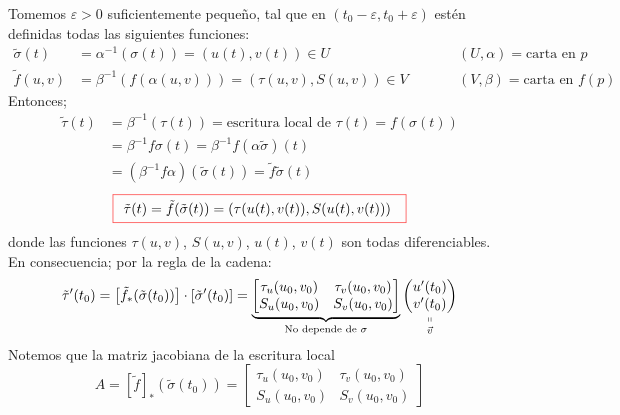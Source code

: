 
   Tomemos $\varepsilon > 0$ suficientemente pequeño, tal que en $(t_0 - \varepsilon, t_0 + \varepsilon)$ estén definidas todas las siguientes funciones:
   \begin{align*}
   \tilde{\sigma}(t) &= \alpha^{-1}(\sigma(t)) = (u(t), v(t)) \in U \quad \quad &&(U, \alpha) = \text{carta en } p \\
   \tilde{f}(u,v) &= \beta^{-1}(f(\alpha(u,v))) = (\tau(u,v), S(u,v)) \in V \quad \quad &&(V, \beta) = \text{carta en } f(p)
   \end{align*}
   Entonces;
   \begin{align*}
      \tilde{\tau}(t) &= \beta^{-1}(\tau(t)) = \text{escritura local de } \tau(t) = f(\sigma(t))\\
                                        &= \beta^{-1} f \sigma(t) = \beta^{-1} f (\alpha \tilde{\sigma})(t) \\
                                        &= (\beta^{-1} f \alpha)(\tilde{\sigma}(t)) = \tilde{f} \tilde{\sigma}(t)
   \end{align*}
   \vspace{-0.5cm}
   \begin{equation}
   \boxedred{\tilde{\tau}(t) = \tilde{f}(\tilde{\sigma}(t)) = (\tau(u(t),v(t)), S(u(t),v(t)))}
   \end{equation}
   donde las funciones $\tau(u,v)$, $S(u,v)$, $u(t)$, $v(t)$ son todas diferenciables. En consecuencia; por la regla de la cadena:
   \begin{equation}
   \tilde{\tau}'(t_0) = \left[\tilde{f}_{*} (\tilde{\sigma}(t_0))\right] \cdot [\tilde{\sigma}'(t_0)] = 
   \underbrace{
   \begin{bmatrix}
   \tau_u(u_0, v_0) & \tau_v(u_0, v_0) \\
   S_u(u_0, v_0) & S_v(u_0, v_0)
   \end{bmatrix}}_{\text{No depende de }\sigma}
   \underset{\vec{v}}{\underset{\shortparallel}{\begin{pmatrix}
   u'(t_0) \\
   v'(t_0)
   \end{pmatrix}}}   
   \end{equation}
   Notemos que la matriz jacobiana de la escritura local
   \begin{equation}
      A = \left[ \tilde{f} \right]_{*}{(\tilde{\sigma}(t_0))} = 
   \begin{bmatrix}
   \tau_u(u_0, v_0) & \tau_v(u_0, v_0) \\
   S_u(u_0, v_0) & S_v(u_0, v_0)
   \end{bmatrix}
   \end{equation}
